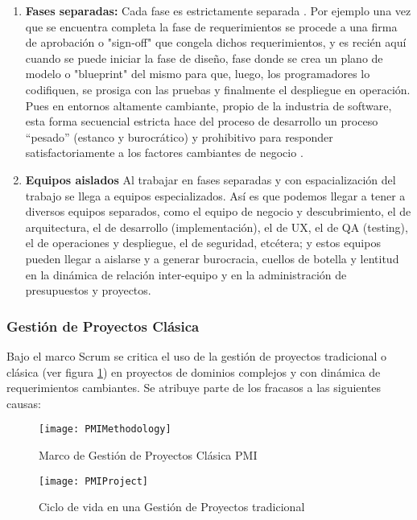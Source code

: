 \begin{enumerate}
\item \textbf{Fases separadas:} \newline
Cada fase es estrictamente separada \cite{Scrum-Institute-2015}. Por ejemplo una vez que se encuentra completa la fase de requerimientos se procede a una firma de aprobación o "sign-off" que congela dichos requerimientos, y es recién aquí cuando se puede iniciar la fase de diseño, fase donde se crea un plano de modelo o "blueprint" del mismo para que, luego, los programadores lo codifiquen, se prosiga con las pruebas y finalmente el despliegue en operación. Pues en entornos altamente cambiante, propio de la industria de software, esta forma secuencial estricta hace del proceso de desarrollo un proceso “pesado” (estanco y burocrático) y prohibitivo para responder satisfactoriamente a los factores cambiantes de negocio \cite{Martin-Alaimo-2014}.

\item \textbf{Equipos aislados} \newline
Al trabajar en fases separadas y con espacialización del trabajo se llega a equipos especializados. Así es que podemos llegar a tener a diversos equipos separados, como el equipo de negocio y descubrimiento, el de arquitectura, el de desarrollo (implementación), el de UX, el de QA (testing), el de operaciones y despliegue, el de seguridad, etcétera; y estos equipos pueden llegar a aislarse y a generar burocracia, cuellos de botella y lentitud en la dinámica de relación inter-equipo y en la administración de presupuestos y proyectos.

\end{enumerate}

\subsubsection{Gestión de Proyectos Clásica}

Bajo el marco Scrum se critica el uso de la gestión de proyectos tradicional o clásica (ver figura \ref{fig:PMIMethodology}) en proyectos de dominios complejos y con dinámica de requerimientos cambiantes. Se atribuye parte de los fracasos a las siguientes causas:

\begin{figure}[h]
  \centering
  \texttt{[image: PMIMethodology]}
  \caption{Marco de Gestión de Proyectos Clásica PMI}
  \centering
  \label{fig:PMIMethodology} %
\end{figure}
\begin{figure}[h]
  \centering
  \texttt{[image: PMIProject]}
  \caption{Ciclo de vida en una Gestión de Proyectos tradicional}
  \centering
  \label{fig:PMIProject} %
\end{figure}

